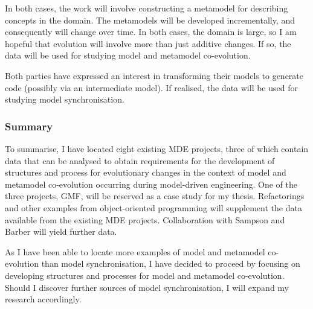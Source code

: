 In both cases, the work will involve constructing a metamodel for describing concepts in the domain. The metamodels will be developed incrementally, and consequently will change over time. In both cases, the domain is large, so I am hopeful that evolution will involve more than just additive changes. If so, the data will be used for studying model and metamodel co-evolution.

Both parties have expressed an interest in transforming their models to generate code (possibly via an intermediate model). If realised, the data will be used for studying model synchronisation.


\subsubsection{Summary}
To summarise, I have located eight existing MDE projects, three of which contain data that can be analysed to obtain requirements for the development of structures and process for evolutionary changes in the context of model and metamodel co-evolution occurring during model-driven engineering. One of the three projects, GMF, will be reserved as a case study for my thesis. Refactorings and other examples from object-oriented programming will supplement the data available from the existing MDE projects. Collaboration with Sampson and Barber will yield further data.

As I have been able to locate more examples of model and metamodel co-evolution than model synchronisation, I have decided to proceed by focusing on developing structures and processes for model and metamodel co-evolution. Should I discover further sources of model synchronisation, I will expand my research accordingly.




